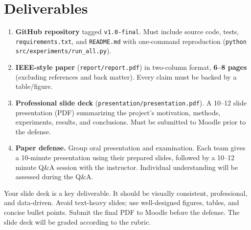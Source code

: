 \documentclass[11pt,a4paper]{article}
\begin{document}
\section{Deliverables}\label{sec:deliverables}
\begin{enumerate}[topsep=2pt,itemsep=4pt,leftmargin=2.2em]
  \item \textbf{GitHub repository} tagged \texttt{v1.0-final}. Must include source code, tests, \texttt{requirements.txt}, and \texttt{README.md} with one-command reproduction (\texttt{python src/experiments/run\_all.py}).
  \item \textbf{IEEE-style paper} (\texttt{report/report.pdf}) in two-column format, \textbf{6--8 pages} (excluding references and back matter). Every claim must be backed by a table/figure.
  \item \textbf{Professional slide deck} (\texttt{presentation/presentation.pdf}). A 10--12 slide presentation (PDF) summarizing the project's motivation, methods, experiments, results, and conclusions. Must be submitted to Moodle prior to the defense.
  \item \textbf{Paper defense.} Group oral presentation and examination. Each team gives a 10-minute presentation using their prepared slides, followed by a 10--12 minute Q\&A session with the instructor. Individual understanding will be assessed during the Q\&A.
\end{enumerate}
\begin{warnbox}
Your slide deck is a key deliverable. It should be visually consistent, professional, and data-driven. Avoid text-heavy slides; use well-designed figures, tables, and concise bullet points. Submit the final PDF to Moodle before the defense. The slide deck will be graded according to the rubric.
\end{warnbox}
\end{document}
